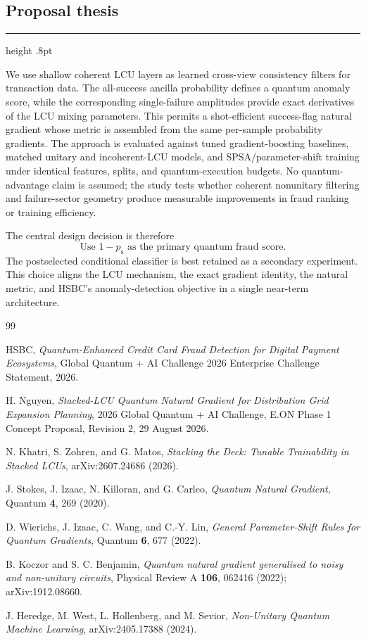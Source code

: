 \documentclass[11pt,a4paper]{article}
\newcommand{\psucc}{p_{\mathrm{s}}}
\newenvironment{keybox}
 {\par\smallskip\noindent\begin{minipage}{\linewidth}%
  {\color{blue!45!black}\hrule height .8pt}\vspace{5pt}}
 {\vspace{5pt}{\color{blue!45!black}\hrule height .8pt}%
  \end{minipage}\par\smallskip}
\begin{document}
\subsection{Proposal thesis}

\begin{keybox}
We use shallow coherent LCU layers as learned cross-view consistency filters for transaction data. The all-success ancilla probability defines a quantum anomaly score, while the corresponding single-failure amplitudes provide exact derivatives of the LCU mixing parameters. This permits a shot-efficient success-flag natural gradient whose metric is assembled from the same per-sample probability gradients. The approach is evaluated against tuned gradient-boosting baselines, matched unitary and incoherent-LCU models, and SPSA/parameter-shift training under identical features, splits, and quantum-execution budgets. No quantum-advantage claim is assumed; the study tests whether coherent nonunitary filtering and failure-sector geometry produce measurable improvements in fraud ranking or training efficiency.
\end{keybox}

The central design decision is therefore
\begin{equation}
\boxed{
\text{Use }1-\psucc\text{ as the primary quantum fraud score.}
}
\end{equation}
The postselected conditional classifier is best retained as a secondary experiment. This choice aligns the LCU mechanism, the exact gradient identity, the natural metric, and HSBC's anomaly-detection objective in a single near-term architecture.

\clearpage
\begin{thebibliography}{99}

HSBC,
\emph{Quantum-Enhanced Credit Card Fraud Detection for Digital Payment Ecosystems},
Global Quantum + AI Challenge 2026 Enterprise Challenge Statement, 2026.

H. Nguyen,
\emph{Stacked-LCU Quantum Natural Gradient for Distribution Grid Expansion Planning},
2026 Global Quantum + AI Challenge, E.ON Phase 1 Concept Proposal, Revision 2, 29 August 2026.

N. Khatri, S. Zohren, and G. Matos,
\emph{Stacking the Deck: Tunable Trainability in Stacked LCUs},
arXiv:2607.24686 (2026).

J. Stokes, J. Izaac, N. Killoran, and G. Carleo,
\emph{Quantum Natural Gradient},
Quantum \textbf{4}, 269 (2020).

D. Wierichs, J. Izaac, C. Wang, and C.-Y. Lin,
\emph{General Parameter-Shift Rules for Quantum Gradients},
Quantum \textbf{6}, 677 (2022).

B. Koczor and S. C. Benjamin,
\emph{Quantum natural gradient generalised to noisy and non-unitary circuits},
Physical Review A \textbf{106}, 062416 (2022); arXiv:1912.08660.

J. Heredge, M. West, L. Hollenberg, and M. Sevior,
\emph{Non-Unitary Quantum Machine Learning},
arXiv:2405.17388 (2024).

\end{thebibliography}
\end{document}
